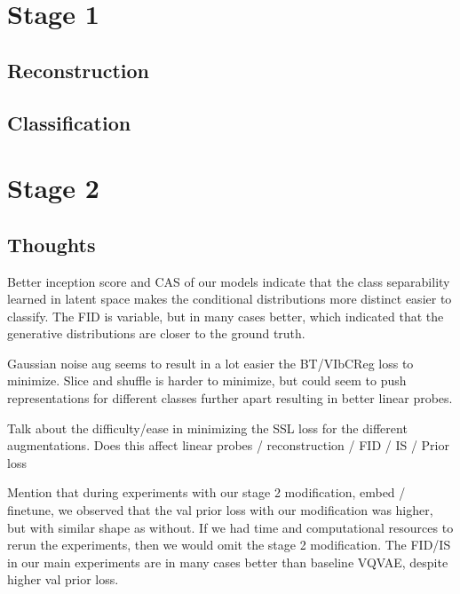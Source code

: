 \documentclass[../../thesis.tex]{subfiles}
\begin{document}
\section{Stage 1}

\subsection{Reconstruction}


\subsection{Classification}


\section{Stage 2}


\subsection{Thoughts}

Better inception score and CAS of our models indicate that the class separability learned in latent space makes the conditional distributions more distinct easier to classify. The FID is variable, but in many cases better, which indicated that the generative distributions are closer to the ground truth.\newline

Gaussian noise aug seems to result in a lot easier the BT/VIbCReg loss to minimize. \newline
Slice and shuffle is harder to minimize, but could seem to push representations for different classes further apart resulting in better linear probes.\newline

Talk about the difficulty/ease in minimizing the SSL loss for the different augmentations. Does this affect linear probes / reconstruction / FID / IS / Prior loss
\newline

Mention that during experiments with our stage 2 modification, embed / finetune, we observed that the val prior loss with our modification was higher, but with similar shape as without. If we had time and computational resources to rerun the experiments, then we would omit the stage 2 modification. The FID/IS in our main experiments are in many cases better than baseline VQVAE, despite higher val prior loss.
\newline
\end{document}
